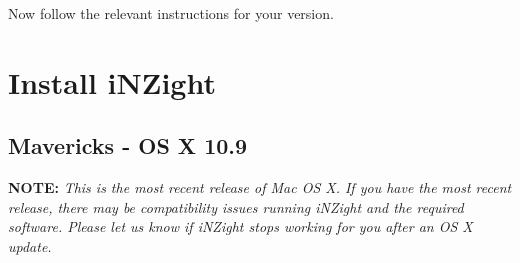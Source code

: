 \documentclass[10pt,a4paper,twoside]{article}
\begin{document}
Now follow the relevant instructions for your version.

\vfill
\tableofcontents

\vfill\pagebreak
\section{Install iNZight}
\subsection{Mavericks - OS X 10.9}
\label{inst-mav}

\textbf{NOTE:} \emph{This is the most recent release of Mac OS X. If you have the most
  recent release, there may be compatibility issues running iNZight and the required
  software. Please let us know if iNZight stops working for you after an OS X update.}
\end{document}
